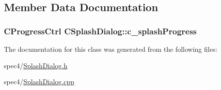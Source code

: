 \subsection{Member Data Documentation}
\hypertarget{classCSplashDialog_ad7450722ad4ee62e87390e01bb15b13e}{
\subsubsection[{c\_\-splashProgress}]{\setlength{\rightskip}{0pt plus 5cm}CProgressCtrl {\bf CSplashDialog::c\_\-splashProgress}}}
\label{classCSplashDialog_ad7450722ad4ee62e87390e01bb15b13e}


The documentation for this class was generated from the following files:\begin{DoxyCompactItemize}
\item 
spec4/\hyperlink{SplashDialog_8h}{SplashDialog.h}\item 
spec4/\hyperlink{SplashDialog_8cpp}{SplashDialog.cpp}\end{DoxyCompactItemize}
